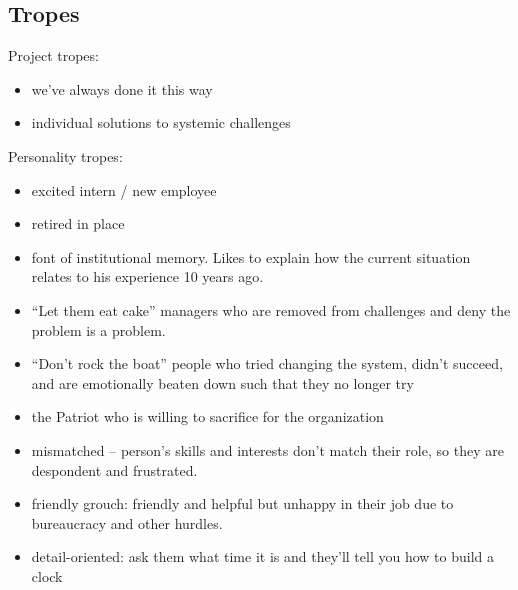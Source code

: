 \subsection{Tropes\label{sec:tropes}}

Project tropes:
\begin{itemize}
    \item we've always done it this way
    \item individual solutions to systemic challenges
\end{itemize}


Personality tropes:
\begin{itemize}
    \item excited intern / new employee
    \item retired in place
    \item font of institutional memory. Likes to explain how the current situation relates to his experience 10 years ago. 
    \item ``Let them eat cake'' managers who are removed from challenges and deny the problem is a problem. 
    \item ``Don't rock the boat'' people who tried changing the system, didn't succeed, and are emotionally beaten down such that they no longer try
    \item the Patriot who is willing to sacrifice for the organization
    \item mismatched -- person's skills and interests don't match their role, so they are despondent and frustrated. 
    \item friendly grouch: friendly and helpful but unhappy in their job due to bureaucracy and other hurdles.
    \item detail-oriented: ask them what time it is and they'll tell you how to build a clock
\end{itemize}


